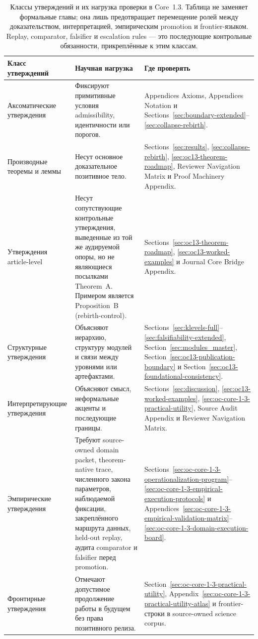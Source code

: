 \begin{table}[htbp]
\centering
\begingroup
\footnotesize
\RaggedRight
\setlength{\tabcolsep}{4pt}
\begin{tabular}{@{}L{0.21\textwidth}L{0.28\textwidth}L{0.39\textwidth}@{}}
\toprule
\textbf{Класс утверждений} & \textbf{Научная нагрузка} & \textbf{Где проверять} \\
\midrule
Аксоматические утверждения & Фиксируют примитивные условия admissibility, идентичности или порогов. & Appendices Axioms, Appendices Notation и Sections~\ref{sec:boundary-extended}--\ref{sec:collapse-rebirth}. \\
Производные теоремы и леммы & Несут основное доказательное позитивное тело. & Sections~\ref{sec:results}, \ref{sec:collapse-rebirth}, \ref{sec:oc13-theorem-roadmap}, Reviewer Navigation Matrix и Proof Machinery Appendix. \\
Утверждения article-level & Несут сопутствующие контрольные утверждения, выведенные из той же аудируемой опоры, но не являющиеся посылками Theorem~A. Примером является Proposition~B (rebirth-control). & Sections~\ref{sec:oc13-theorem-roadmap}, \ref{sec:oc13-worked-examples} и Journal Core Bridge Appendix. \\
Структурные утверждения & Объясняют иерархию, структуру модулей и связи между уровнями или артефактами. & Sections~\ref{sec:klevels-full}--\ref{sec:falsifiability-extended}, Section~\ref{sec:modules_master}, Section~\ref{sec:oc13-publication-boundary} и Section~\ref{sec:oc13-foundational-consistency}. \\
Интерпретирующие утверждения & Объясняют смысл, неформальные акценты и последующие границы. & Sections~\ref{sec:discussion}, \ref{sec:oc13-worked-examples}, \ref{sec:oc-core-1-3-practical-utility}, Source Audit Appendix и Reviewer Navigation Matrix. \\
Эмпирические утверждения & Требуют source-owned domain packet, theorem-native trace, численного закона параметров, наблюдаемой фиксации, закреплённого маршрута данных, held-out replay, аудита comparator и falsifier перед promotion. & Sections~\ref{sec:oc-core-1-3-operationalization-program}--\ref{sec:oc-core-1-3-empirical-execution-protocols} и Appendices~\ref{sec:oc-core-1-3-empirical-validation-matrix}--\ref{sec:oc-core-1-3-domain-execution-board}. \\
Фронтирные утверждения & Отмечают допустимое продолжение работы в будущем без права позитивного релиза. & Section~\ref{sec:oc-core-1-3-practical-utility}, Appendix~\ref{sec:oc-core-1-3-practical-utility-atlas} и frontier-строки в source-owned science corpus. \\
\bottomrule
\end{tabular}
\endgroup
\caption{Классы утверждений и их нагрузка проверки в Core~1.3. Таблица не заменяет формальные главы; она лишь предотвращает перемещение ролей между доказательством, интерпретацией, эмпирическим promotion и frontier-языком. Replay, comparator, falsifier и escalation rules — это последующие контрольные обязанности, прикреплённые к этим классам.}
\label{tab:oc13-statement-classes}
\end{table}

